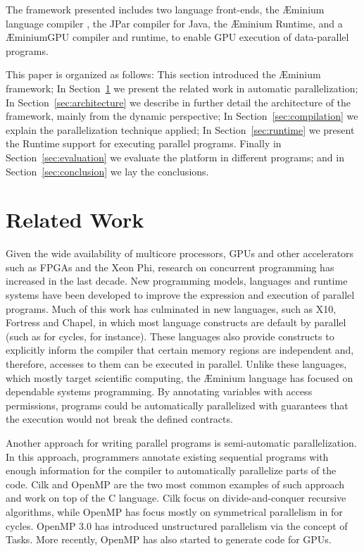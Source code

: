 \documentclass[smallextended]{svjour3}
\begin{document}
The framework presented includes two language front-ends, the Æminium language compiler \cite{stork2014aeminium}, the JPar compiler for Java, the Æminium Runtime, and a ÆminiumGPU\cite{fonseca2013aeminiumgpu} compiler and runtime, to enable GPU execution of data-parallel programs.

This paper is organized as follows: This section introduced the Æminium framework; In Section~\ref{sec:related_work} we present the related work in automatic parallelization; In Section~\ref{sec:architecture} we describe in further detail the architecture of the framework, mainly from the dynamic perspective; In Section~\ref{sec:compilation} we explain the parallelization technique applied; In Section~\ref{sec:runtime} we present the Runtime support for executing parallel programs. Finally in Section~\ref{sec:evaluation} we evaluate the platform in different programs; and in Section~\ref{sec:conclusion} we lay the conclusions.


\section{Related Work}
\label{sec:related_work}


Given the wide availability of multicore processors, GPUs and other accelerators such as FPGAs and the Xeon Phi, research on concurrent programming has increased in the last decade. New programming models, languages and runtime systems have been developed to improve the expression and execution of parallel programs. Much of this work has culminated in new languages, such as X10\cite{charles2005x10}, Fortress\cite{steele2006parallel} and Chapel\cite{chamberlain2007parallel}, in which most language constructs are default by parallel (such as for cycles, for instance). These languages also provide constructs to explicitly inform the compiler that certain memory regions are independent and, therefore, accesses to them can be executed in parallel. Unlike these languages, which mostly target scientific computing, the Æminium language\cite{stork2014aeminium} has focused on dependable systems programming. By annotating variables with access permissions, programs could be automatically parallelized with guarantees that the execution would not break the defined contracts.

Another approach for writing parallel programs is semi-automatic parallelization. In this approach, programmers annotate existing sequential programs with enough information for the compiler to automatically parallelize parts of the code. Cilk\cite{frigo1998implementation} and OpenMP\cite{dagum1998openmp} are the two most common examples of such approach and work on top of the C language. Cilk focus on divide-and-conquer recursive algorithms, while OpenMP has focus mostly on symmetrical parallelism in for cycles. OpenMP 3.0 has introduced unstructured parallelism via the concept of Tasks\cite{ayguade2009design}\cite{ayguade2008experimental}. More recently, OpenMP has also started to generate code for GPUs\cite{lee2009openmp}.
\end{document}
